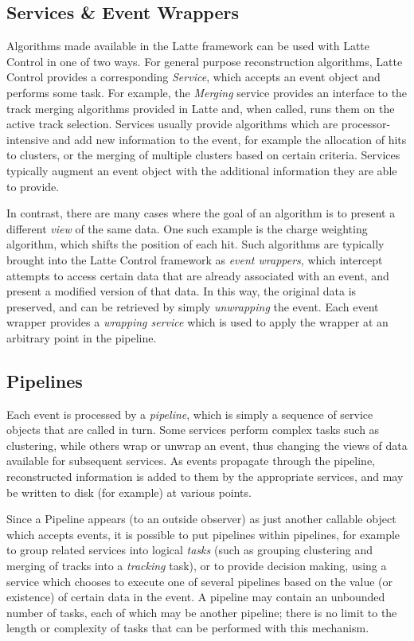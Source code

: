 \subsection{Services \& Event Wrappers}
Algorithms made available in the Latte framework can be used with Latte Control in one of two ways. For general purpose reconstruction algorithms, Latte Control provides a corresponding \emph{Service}, which accepts an event object and performs some task. For example, the \emph{Merging} service provides an interface to the track merging algorithms provided in Latte and, when called, runs them on the active track selection. Services usually provide algorithms which are processor-intensive and add new information to the event, for example the allocation of hits to clusters, or the merging of multiple clusters based on certain criteria. Services typically augment an event object with the additional information they are able to provide.

In contrast, there are many cases where the goal of an algorithm is to present a different \emph{view} of the same data. One such example is the charge weighting algorithm, which shifts the position of each hit. Such algorithms are typically brought into the Latte Control framework as \emph{event wrappers}, which intercept attempts to access certain data that are already associated with an event, and present a modified version of that data. In this way, the original data is preserved, and can be retrieved by simply \emph{unwrapping} the event. Each event wrapper provides a \emph{wrapping service} which is used to apply the wrapper at an arbitrary point in the pipeline.

\subsection{Pipelines}
Each event is processed by a \emph{pipeline}, which is simply a sequence of service objects that are called in turn. Some services perform complex tasks such as clustering, while others wrap or unwrap an event, thus changing the views of data available for subsequent services. As events propagate through the pipeline, reconstructed information is added to them by the appropriate services, and may be written to disk (for example) at various points.

Since a Pipeline appears (to an outside observer) as just another callable object which accepts events, it is possible to put pipelines within pipelines, for example to group related services into logical \emph{tasks} (such as grouping clustering and merging of tracks into a \emph{tracking} task), or to provide decision making, using a service which chooses to execute one of several pipelines based on the value (or existence) of certain data in the event. A pipeline may contain an unbounded number of tasks, each of which may be another pipeline; there is no limit to the length or complexity of tasks that can be performed with this mechanism.

